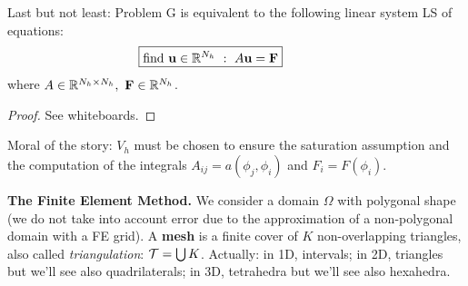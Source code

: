 Last but not least: Problem G is equivalent to the following linear system LS of equations:
\begin{equation*}
\boxed{\text{find } \mathbf{u}\in\mathbb{R}^{N_h}\ :\ A\mathbf{u}=\mathbf{F}}\qquad\qquad
\end{equation*}
where $A\in\RR^{N_h\times N_h},\ \Fv\in\RR^{N_h}$.

\begin{proof}
See whiteboards.
\end{proof}

Moral of the story: $V_h$ must be chosen to ensure the saturation assumption and the computation of the integrals $A_{ij}=a(\phi_j,\phi_i)$ and $F_i=F(\phi_i)$.

\medskip

\textbf{The Finite Element Method.} We consider a domain $\Omega$ with polygonal shape (we do not take into account error due to the approximation of a non-polygonal domain with a FE grid). A \textbf{mesh} is a finite cover of $K$ non-overlapping triangles, also called \emph{triangulation}: $\mathcal{T}=\bigcup K$. Actually: in 1D, intervals; in 2D, triangles but we'll see also quadrilaterals; in 3D, tetrahedra but we'll see also hexahedra.






